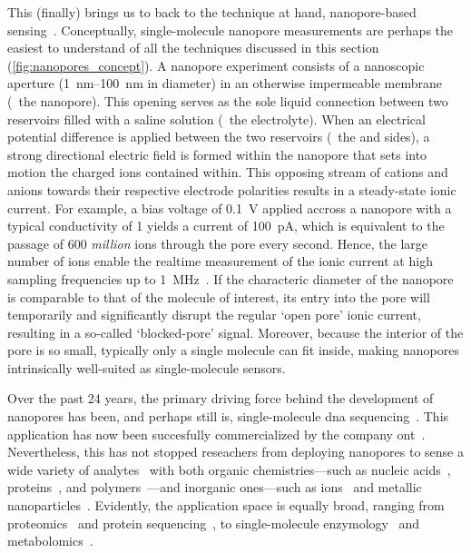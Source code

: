 This (finally) brings us to back to the technique at hand, nanopore-based
sensing~\cite{Howorka-2009,Wang-2018}. Conceptually, single-molecule nanopore measurements are perhaps the
easiest to understand of all the techniques discussed in this section (\cref{fig:nanopores_concept}). A
nanopore experiment consists of a nanoscopic aperture (\SIrange{1}{100}{\nm} in diameter) in an otherwise
impermeable membrane (\ie~the nanopore). This opening serves as the sole liquid connection between two
reservoirs filled with a saline solution (\ie~the electrolyte). When an electrical potential difference is
applied between the two reservoirs (\ie~the \cisi{} and \transi{} sides), a strong directional electric field
is formed within the nanopore that sets into motion the charged ions contained within. This opposing stream of
cations and anions towards their respective electrode polarities results in a steady-state ionic current. For
example, a bias voltage of \SI{0.1}{\volt} applied accross a nanopore with a typical conductivity of
\SI{1}{\nS} yields a current of \SI{100}{\pA}, which is equivalent to the passage of \num{600} \emph{million}
ions through the pore every second. Hence, the large number of ions enable the realtime measurement of the
ionic current at high sampling frequencies up to \SI{1}{\mega\hertz}~\cite{Rosenstein-2012}. If the
characteric diameter of the nanopore is comparable to that of the molecule of interest, its entry into the
pore will temporarily and significantly disrupt the regular `open pore' ionic current, resulting in a
so-called `blocked-pore' signal. Moreover, because the interior of the pore is so small, typically only a
single molecule can fit inside, making nanopores intrinsically well-suited as single-molecule sensors.

Over the past 24 years, the primary driving force behind the development of nanopores has been, and perhaps
still is, single-molecule \gls{dna} sequencing~\cite{Deamer-2016}. This application has now been succesfully
commercialized by the company \gls{ont}~\cite{ONT-2020,Jain-2018}. Nevertheless, this has not stopped
reseachers from deploying nanopores to sense a wide variety of analytes~\cite{Wang-2018} with both organic
chemistries---such as nucleic acids~\cite{Kasianowicz-1996,Meller-2000,Stoddart-2009,Manrao-2012},
proteins~\cite{Mohammad-2008,Firnkes-2010,Spiering-2011,RodriguezLarrea-2013}, and
polymers~\cite{Robertson-2007,Baaken-2011}---and inorganic ones---such as
ions~\cite{Bezrukov-1993,Kasianowicz-1995,Kasianowicz-1999,Ali-2011,Roozbahani-2020} and metallic
nanoparticles~\cite{Astier-2009,Angevine-2014,Campos-2018}. Evidently, the application space is equally broad,
ranging from proteomics~\cite{Yusko-2017,Houghtaling-2019} and protein
sequencing~\cite{Restrepo-Perez-2018,Huang-2019}, to single-molecule
enzymology~\cite{Willems-VanMeervelt-2017,Ho-2015,Wloka-2017,Harrington-2019,Galenkamp-2020} and
metabolomics~\cite{VanMeervelt-2017,Zernia-2020}.

